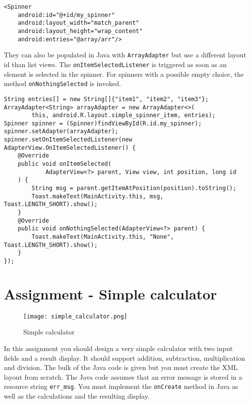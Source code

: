 \begin{lstlisting}[style=A_XML, caption={Spinner declaration}, label={listing:spinxml}]
<Spinner
    android:id="@+id/my_spinner"
    android:layout_width="match_parent"
    android:layout_height="wrap_content"
    android:entries="@array/arr"/>
\end{lstlisting}

They can also be populated in Java with \texttt{ArrayAdapter} but use a different layout id than list views. The \texttt{onItemSelectedListener} is triggered as soon as an element is selected in the spinner. For spinners with a possible empty choice, the method \texttt{onNothingSelected} is invoked.

\begin{lstlisting}[style=A_Java, caption={Spinner population and event}, label={listing:spinpopev}]
String entries[] = new String[]{"item1", "item2", "item3"};
ArrayAdapter<String> arrayAdapter = new ArrayAdapter<>(
        this, android.R.layout.simple_spinner_item, entries);
Spinner spinner = (Spinner)findViewById(R.id.my_spinner);
spinner.setAdapter(arrayAdapter);
spinner.setOnItemSelectedListener(new AdapterView.OnItemSelectedListener() {
    @Override
    public void onItemSelected(
            AdapterView<?> parent, View view, int position, long id
    ) {
        String msg = parent.getItemAtPosition(position).toString();
        Toast.makeText(MainActivity.this, msg, Toast.LENGTH_SHORT).show();
    }
    @Override
    public void onNothingSelected(AdapterView<?> parent) {
        Toast.makeText(MainActivity.this, "None", Toast.LENGTH_SHORT).show();
    }
});
\end{lstlisting}


\section{Assignment - Simple calculator}
\begin{minipage}{0.45\textwidth}
\begin{figure}[H]
\centering
\texttt{[image: simple\_calculator.png]}
\caption{Simple calculator}
\label{fig:simcal}
\end{figure}
\end{minipage}
\hfill
\begin{minipage}{0.475\textwidth}
In this assignment you should design a very simple calculator with two input fields and a result display. It should support addition, subtraction, multiplication and division. The bulk of the Java code is given but you must create the XML layout from scratch. The Java code assumes that an error message is stored in a resource string \texttt{err\_msg}. You must implement the \texttt{onCreate} method in Java as well as the calculations and the resulting display.
\end{minipage}

